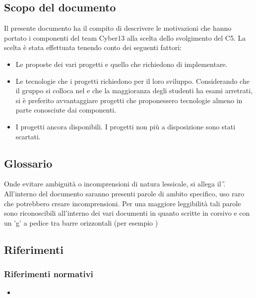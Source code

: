 \subsection{Scopo del documento}
Il presente documento ha il compito di descrivere le motivazioni che hanno portato i componenti del team Cyber13 alla scelta dello svolgimento del  C5. La scelta è stata effettuata tenendo conto dei seguenti fattori:
    \begin{itemize}
        \item Le proposte dei vari progetti e quello che richiedono di implementare.
        \item Le tecnologie che i progetti richiedono per il loro sviluppo. Considerando che il gruppo si colloca nel  e che la maggioranza degli studenti ha esami arretrati, si è preferito avvantaggiare progetti che proponessero tecnologie almeno in parte conosciute dai componenti.
        \item I progetti ancora disponibili. I progetti non più a disposizione sono stati scartati.
    \end{itemize}
		            
\subsection{Glossario}
Onde evitare ambiguità o incomprensioni di natura lessicale, si allega il \G.
All'interno del documento saranno presenti parole di ambito specifico, uso raro che potrebbero creare incomprensioni. Per una maggiore leggibilità tali parole sono riconoscibili all'interno dei vari documenti in quanto scritte in corsivo e con un 'g' a pedice tra barre orizzontali (per esempio )
    
\subsection{Riferimenti}
    \subsubsection{Riferimenti normativi}
        \begin{itemize}
            \item \NdP
        \end{itemize}
    
